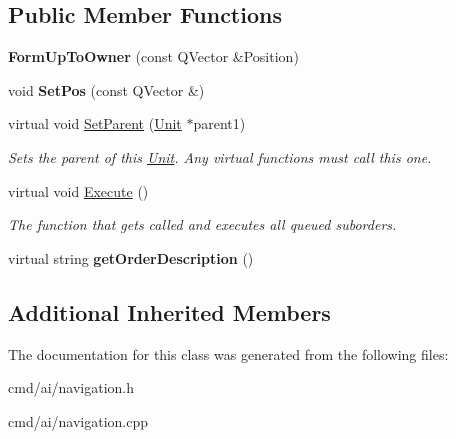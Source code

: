 \subsection*{Public Member Functions}
\begin{DoxyCompactItemize}
\item 
{\bfseries Form\+Up\+To\+Owner} (const Q\+Vector \&Position)\hypertarget{classOrders_1_1FormUpToOwner_aa06faad632be90a167c910119c8d3d5f}{}\label{classOrders_1_1FormUpToOwner_aa06faad632be90a167c910119c8d3d5f}

\item 
void {\bfseries Set\+Pos} (const Q\+Vector \&)\hypertarget{classOrders_1_1FormUpToOwner_ae010362bfdec78bb01a52885726c2581}{}\label{classOrders_1_1FormUpToOwner_ae010362bfdec78bb01a52885726c2581}

\item 
virtual void \hyperlink{classOrders_1_1FormUpToOwner_a1ab7bb84c5cc342a25cd688fc0d4c20c}{Set\+Parent} (\hyperlink{classUnit}{Unit} $\ast$parent1)\hypertarget{classOrders_1_1FormUpToOwner_a1ab7bb84c5cc342a25cd688fc0d4c20c}{}\label{classOrders_1_1FormUpToOwner_a1ab7bb84c5cc342a25cd688fc0d4c20c}

\begin{DoxyCompactList}\small\item\em Sets the parent of this \hyperlink{classUnit}{Unit}. Any virtual functions must call this one. \end{DoxyCompactList}\item 
virtual void \hyperlink{classOrders_1_1FormUpToOwner_aed42110ce2b3f3c6852588cd6627700d}{Execute} ()\hypertarget{classOrders_1_1FormUpToOwner_aed42110ce2b3f3c6852588cd6627700d}{}\label{classOrders_1_1FormUpToOwner_aed42110ce2b3f3c6852588cd6627700d}

\begin{DoxyCompactList}\small\item\em The function that gets called and executes all queued suborders. \end{DoxyCompactList}\item 
virtual string {\bfseries get\+Order\+Description} ()\hypertarget{classOrders_1_1FormUpToOwner_a87a841c15ba48fa9131a139f7cd7849d}{}\label{classOrders_1_1FormUpToOwner_a87a841c15ba48fa9131a139f7cd7849d}

\end{DoxyCompactItemize}
\subsection*{Additional Inherited Members}


The documentation for this class was generated from the following files\+:\begin{DoxyCompactItemize}
\item 
cmd/ai/navigation.\+h\item 
cmd/ai/navigation.\+cpp\end{DoxyCompactItemize}
